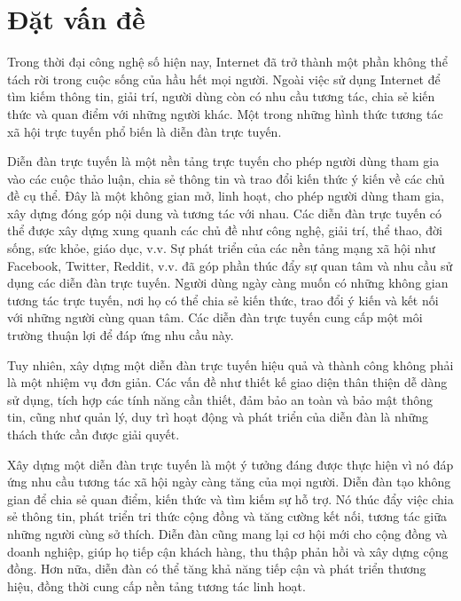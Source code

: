 \documentclass[../index.tex]{subfiles}
\begin{document}
    \section{Đặt vấn đề}
    Trong thời đại công nghệ số hiện nay, Internet đã trở thành một phần không
    thể tách rời trong cuộc sống của hầu hết mọi người. Ngoài việc sử dụng Internet
    để tìm kiếm thông tin, giải trí, người dùng còn có nhu cầu tương tác, chia
    sẻ kiến thức và quan điểm với những người khác. Một trong những hình thức tương
    tác xã hội trực tuyến phổ biến là diễn đàn trực tuyến.

    Diễn đàn trực tuyến là một nền tảng trực tuyến cho phép người dùng tham gia vào
    các cuộc thảo luận, chia sẻ thông tin và trao đổi kiến thức ý kiến về các
    chủ đề cụ thể. Đây là một không gian mở, linh hoạt, cho phép người dùng tham
    gia, xây dựng đóng góp nội dung và tương tác với nhau. Các diễn đàn trực tuyến
    có thể được xây dựng xung quanh các chủ đề như công nghệ, giải trí, thể thao,
    đời sống, sức khỏe, giáo dục, v.v. Sự phát triển của các nền tảng mạng xã
    hội như Facebook, Twitter, Reddit, v.v. đã góp phần thúc đẩy sự quan tâm và
    nhu cầu sử dụng các diễn đàn trực tuyến. Người dùng ngày càng muốn có những không
    gian tương tác trực tuyến, nơi họ có thể chia sẻ kiến thức, trao đổi ý kiến và
    kết nối với những người cùng quan tâm. Các diễn đàn trực tuyến cung cấp một
    môi trường thuận lợi để đáp ứng nhu cầu này.

    Tuy nhiên, xây dựng một diễn đàn trực tuyến hiệu quả và thành công không phải
    là một nhiệm vụ đơn giản. Các vấn đề như thiết kế giao diện thân thiện dễ
    dàng sử dụng, tích hợp các tính năng cần thiết, đảm bảo an toàn và bảo mật
    thông tin, cũng như quản lý, duy trì hoạt động và phát triển của diễn đàn là
    những thách thức cần được giải quyết.

    Xây dựng một diễn đàn trực tuyến là một ý tưởng đáng được thực hiện vì nó
    đáp ứng nhu cầu tương tác xã hội ngày càng tăng của mọi người. Diễn đàn tạo không
    gian để chia sẻ quan điểm, kiến thức và tìm kiếm sự hỗ trợ. Nó thúc đẩy việc
    chia sẻ thông tin, phát triển tri thức cộng đồng và tăng cường kết nối, tương
    tác giữa những người cùng sở thích. Diễn đàn cũng mang lại cơ hội mới cho
    cộng đồng và doanh nghiệp, giúp họ tiếp cận khách hàng, thu thập phản hồi và
    xây dựng cộng đồng. Hơn nữa, diễn đàn có thể tăng khả năng tiếp cận và phát
    triển thương hiệu, đồng thời cung cấp nền tảng tương tác linh hoạt.
\end{document}
